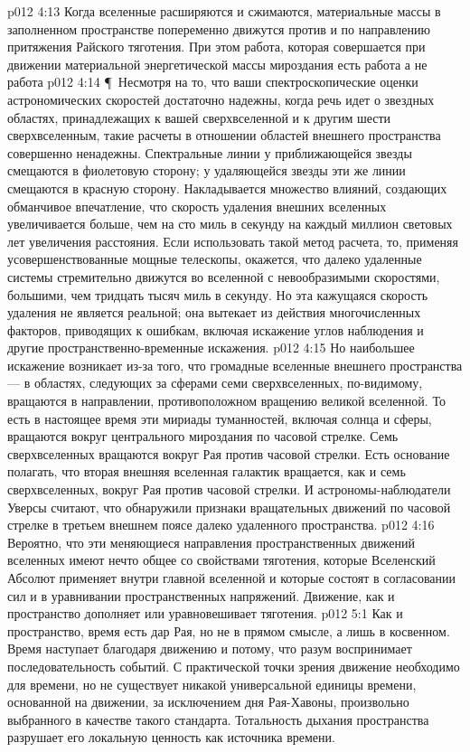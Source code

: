 \vs p012 4:13 Когда вселенные расширяются и сжимаются, материальные массы в заполненном пространстве попеременно движутся против и по направлению притяжения Райского тяготения. При этом работа, которая совершается при движении материальной энергетической массы мироздания есть работа  а не работа 
\vs p012 4:14 \P\ Несмотря на то, что ваши спектроскопические оценки астрономических скоростей достаточно надежны, когда речь идет о звездных областях, принадлежащих к вашей сверхвселенной и к другим шести сверхвселенным, такие расчеты в отношении областей внешнего пространства совершенно ненадежны. Спектральные линии у приближающейся звезды смещаются в фиолетовую сторону; у удаляющейся звезды эти же линии смещаются в красную сторону. Накладывается множество влияний, создающих обманчивое впечатление, что скорость удаления внешних вселенных увеличивается больше, чем на сто миль в секунду на каждый миллион световых лет увеличения расстояния. Если использовать такой метод расчета, то, применяя усовершенствованные мощные телескопы, окажется, что далеко удаленные системы стремительно движутся во вселенной с невообразимыми скоростями, большими, чем тридцать тысяч миль в секунду. Но эта кажущаяся скорость удаления не является реальной; она вытекает из действия многочисленных факторов, приводящих к ошибкам, включая искажение углов наблюдения и другие пространственно\hyp{}временные искажения.
\vs p012 4:15 Но наибольшее искажение возникает из\hyp{}за того, что громадные вселенные внешнего пространства --- в областях, следующих за сферами семи сверхвселенных, по\hyp{}видимому, вращаются в направлении, противоположном вращению великой вселенной. То есть в настоящее время эти мириады туманностей, включая солнца и сферы, вращаются вокруг центрального мироздания по часовой стрелке. Семь сверхвселенных вращаются вокруг Рая против часовой стрелки. Есть основание полагать, что вторая внешняя вселенная галактик вращается, как и семь сверхвселенных, вокруг Рая против часовой стрелки. И астрономы\hyp{}наблюдатели Уверсы считают, что обнаружили признаки вращательных движений по часовой стрелке в третьем внешнем поясе далеко удаленного пространства.
\vs p012 4:16 Вероятно, что эти меняющиеся направления пространственных движений вселенных имеют нечто общее со свойствами тяготения, которые Вселенский Абсолют применяет внутри главной вселенной и которые состоят в согласовании сил и в уравнивании пространственных напряжений. Движение, как и пространство дополняет или уравновешивает тяготения.
\vs p012 5:1 Как и пространство, время есть дар Рая, но не в прямом смысле, а лишь в косвенном. Время наступает благодаря движению и потому, что разум воспринимает последовательность событий. С практической точки зрения движение необходимо для времени, но не существует никакой универсальной единицы времени, основанной на движении, за исключением дня Рая\hyp{}Хавоны, произвольно выбранного в качестве такого стандарта. Тотальность дыхания пространства разрушает его локальную ценность как источника времени.
